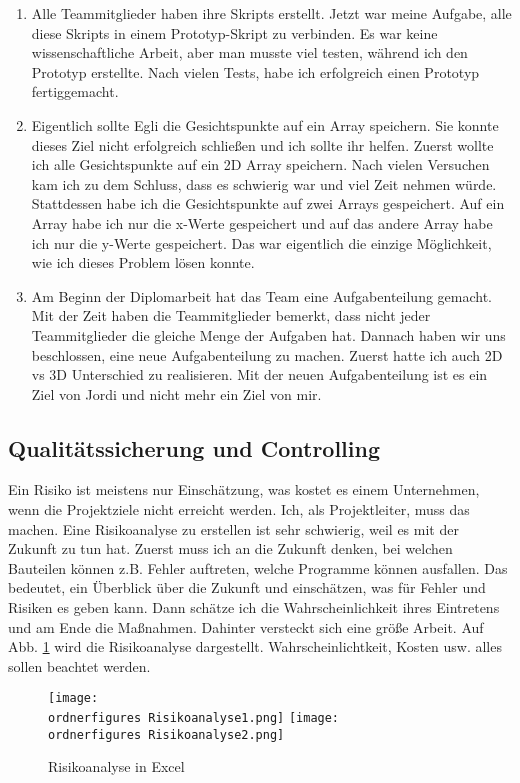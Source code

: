 \begin{itemize}
\begin{enumerate}
	\item Alle Teammitglieder haben ihre Skripts erstellt. Jetzt war meine Aufgabe, alle diese Skripts in einem Prototyp-Skript zu verbinden. Es war keine wissenschaftliche Arbeit, aber man musste viel testen, w\"ahrend ich den Prototyp erstellte. Nach vielen Tests, habe ich erfolgreich einen Prototyp fertiggemacht.
	
	\item Eigentlich sollte Egli die Gesichtspunkte auf ein Array speichern. Sie konnte dieses Ziel nicht erfolgreich schlie{\ss}en und ich sollte ihr helfen. Zuerst wollte ich alle Gesichtspunkte auf ein 2D Array speichern. Nach vielen Versuchen kam ich zu dem Schluss, dass es schwierig war und viel Zeit nehmen w\"urde. Stattdessen habe ich die Gesichtspunkte auf zwei Arrays gespeichert. Auf ein Array habe ich nur die x-Werte gespeichert und auf das andere Array habe ich nur die y-Werte gespeichert. Das war eigentlich die einzige M\"oglichkeit, wie ich dieses Problem l\"osen konnte. 
	
	\item Am Beginn der Diplomarbeit hat das Team eine Aufgabenteilung gemacht. Mit der Zeit haben die Teammitglieder bemerkt, dass nicht jeder Teammitglieder die gleiche Menge der Aufgaben hat. Dannach haben wir uns beschlossen, eine neue Aufgabenteilung zu machen. Zuerst hatte ich auch 2D vs 3D Unterschied zu realisieren. Mit der neuen Aufgabenteilung ist es ein Ziel von Jordi und nicht mehr ein Ziel von mir. 
\end{enumerate}
\end{itemize}
\subsection{Qualit\"atssicherung und Controlling}
Ein Risiko ist meistens nur Einsch\"atzung, was kostet es einem Unternehmen, wenn die Projektziele nicht erreicht werden. Ich, als Projektleiter, muss das machen. Eine Risikoanalyse zu erstellen ist sehr schwierig, weil es mit der Zukunft zu tun hat. Zuerst muss ich an die Zukunft denken, bei welchen Bauteilen k\"onnen z.B. Fehler auftreten, welche Programme k\"onnen ausfallen. Das bedeutet, ein \"Uberblick \"uber die Zukunft und einsch\"atzen, was f\"ur Fehler und Risiken es geben kann. Dann sch\"atze ich die Wahrscheinlichkeit ihres Eintretens und am Ende die Ma{\ss}nahmen. Dahinter versteckt sich eine gr{\"o}{\ss}e Arbeit.\cite{Risikoanalyse} 
Auf Abb. \ref{fig:Risikoanalyse} wird die Risikoanalyse dargestellt. Wahrscheinlichtkeit, Kosten usw. alles sollen beachtet werden.
\begin{figure}[H]
	\texttt{[image: \\ordnerfigures Risikoanalyse1.png]}
	\texttt{[image: \\ordnerfigures Risikoanalyse2.png]}
	\caption{Risikoanalyse in Excel}
	\label{fig:Risikoanalyse}
\end{figure}
